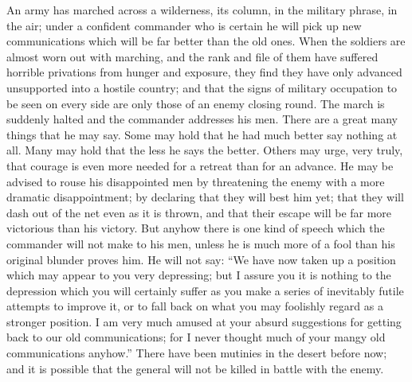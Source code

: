 \documentclass{book}
\begin{document}
An army has marched across a wilderness, its column, in the military phrase, in the air; under a confident commander who is certain he will pick up new communications which will be far better than the old ones. When the soldiers are almost worn out with marching, and the rank and file of them have suffered horrible privations from hunger and exposure, they find they have only advanced unsupported into a hostile country; and that the signs of military occupation to be seen on every side are only those of an enemy closing round. The march is suddenly halted and the commander addresses his men. There are a great many things that he may say. Some may hold that he had much better say nothing at all. Many may hold that the less he says the better. Others may urge, very truly, that courage is even more needed for a retreat than for an advance. He may be advised to rouse his disappointed men by threatening the enemy with a more dramatic disappointment; by declaring that they will best him yet; that they will dash out of the net even as it is thrown, and that their escape will be far more victorious than his victory. But anyhow there is one kind of speech which the commander will not make to his men, unless he is much more of a fool than his original blunder proves him. He will not say: “We have now taken up a position which may appear to you very depressing; but I assure you it is nothing to the depression which you will certainly suffer as you make a series of inevitably futile attempts to improve it, or to fall back on what you may foolishly regard as a stronger position. I am very much amused at your absurd suggestions for getting back to our old communications; for I never thought much of your mangy old communications anyhow.” There have been mutinies in the desert before now; and it is possible that the general will not be killed in battle with the enemy.
\end{document}
